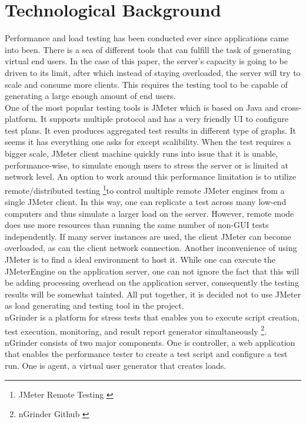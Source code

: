 \chapter{Technological Background}
\label{technological background}
Performance and load testing has been conducted ever since applications came into been. There is a sea of different tools that can fulfill the task of generating virtual end users. In the case of this paper, the server's capacity is going to be driven to its limit, after which instead of staying overloaded, the server will try to scale and consume more clients. This requires the testing tool to be capable of generating a large enough amount of end users. \\
One of the most popular testing tools is JMeter which is based on Java and cross-platform. It supports multiple protocol and has a very friendly UI to configure test plans. It even produces aggregated test results in different type of graphs. It seems it has everything one asks for except scalibility. When the test requires a bigger scale, JMeter client machine quickly runs into issue that it is unable, performance-wise, to simulate enough users to stress the server or is limited at network level. An option to work around this performance limitation is to utilize remote/distributed testing \footnote{JMeter Remote Testing \cite{JMeterRemote}}to control multiple remote JMeter engines from a single JMeter client. In this way, one can replicate a test across many low-end computers and thus simulate a larger load on the server. However, remote mode does use more resources than running the same number of non-GUI tests independently. If many server instances are used, the client JMeter can become overloaded, as can the client network connection. Another inconvenience of using JMeter is to find a ideal environment to host it. While one can execute the JMeterEngine on the application server, one can not ignore the fact that this will be adding processing overhead on the application server, consequently  the testing results will be somewhat tainted. All put together, it is decided not to use JMeter as load generating and testing tool in the project. \\
nGrinder is a platform for stress tests that enables you to execute script creation, test execution, monitoring, and result report generator simultaneously \footnote{nGrinder Github \cite{NGrinder}}. nGrinder consists of two major components. One is  controller, a web application that enables the performance tester to create a test script and configure a test run. One is agent, a virtual user generator that creates loads. 
